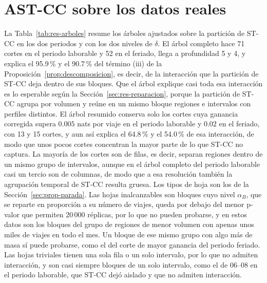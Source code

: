\section{AST-CC sobre los datos reales}\label{sec:res-arbol}

La Tabla~\ref{tab:res-arboles} resume los árboles ajustados sobre la partición de
ST-CC en los dos periodos y con los dos niveles de $\delta$. El árbol completo
hace 71 cortes en el periodo laborable y 52 en el feriado, llega a profundidad 5
y 4, y explica el 95.9\,\% y el 90.7\,\% del término (iii) de la
Proposición~\ref{prop:descomposicion}, es decir, de la interacción que la
partición de ST-CC deja dentro de sus bloques. Que el árbol explique casi toda
esa interacción es lo esperable según la Sección~\ref{sec:res-reparacion}, porque
la partición de ST-CC agrupa por volumen y reúne en un mismo bloque regiones e
intervalos con perfiles distintos. El árbol resumido conserva solo los cortes
cuya ganancia corregida supera $0.005$ nats por viaje en el periodo laborable y
$0.02$ en el feriado, con 13 y 15 cortes, y aun así explica el 64.8\,\% y el
54.0\,\% de esa interacción, de modo que unos pocos cortes concentran la mayor
parte de lo que ST-CC no captura. La mayoría de los cortes son de filas, es
decir, separan regiones dentro de un mismo grupo de intervalos, aunque en el árbol
completo del periodo laborable casi un tercio son de columnas, de modo que a esa
resolución también la agrupación temporal de ST-CC resulta gruesa. Los tipos de
hoja son los de la Sección~\ref{sec:prop-parada}. Las hojas inalcanzables son
bloques cuyo nivel $\alpha_B$, que se reparte en proporción a su número de viajes,
queda por debajo del menor p-valor que permiten 20\,000 réplicas, por lo que no
pueden probarse, y en estos datos son los bloques del grupo de regiones de menor
volumen con apenas unos miles de viajes en todo el mes. Un bloque de ese mismo
grupo con algo más de masa sí puede probarse, como el del corte de mayor ganancia
del periodo feriado. Las hojas triviales tienen una sola fila o un solo intervalo,
por lo que no admiten interacción, y son casi siempre bloques de un solo intervalo, como el de 06--08 en el periodo
laborable, que ST-CC dejó aislado y que no admiten interacción.

